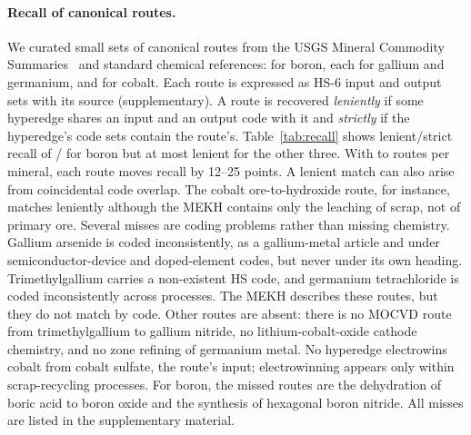 \paragraph{Recall of canonical routes.}
We curated small sets of canonical routes from the USGS Mineral Commodity Summaries~\cite{usgsmcs2025} and standard chemical references: \RoutesNBoron{} for boron, \RoutesNGallium{} each for gallium and germanium, and \RoutesNCobalt{} for cobalt. Each route is expressed as HS-6 input and output sets with its source (supplementary). A route is recovered \emph{leniently} if some hyperedge shares an input and an output code with it and \emph{strictly} if the hyperedge's code sets contain the route's. Table~\ref{tab:recall} shows lenient/strict recall of \RecallLenientBoron{}/\RecallStrictBoron{} for boron but at most \RecallLenientGermanium{} lenient for the other three. With \RoutesNMin{} to \RoutesNMax{} routes per mineral, each route moves recall by 12--25 points. A lenient match can also arise from coincidental code overlap. The cobalt ore-to-hydroxide route, for instance, matches leniently although the MEKH contains only the leaching of scrap, not of primary ore. Several misses are coding problems rather than missing chemistry. Gallium arsenide is coded inconsistently, as a gallium-metal article and under semiconductor-device and doped-element codes, but never under its own heading. Trimethylgallium carries a non-existent HS code, and germanium tetrachloride is coded inconsistently across processes. The MEKH describes these routes, but they do not match by code. Other routes are absent: there is no MOCVD route from trimethylgallium to gallium nitride, no lithium-cobalt-oxide cathode chemistry, and no zone refining of germanium metal. No hyperedge electrowins cobalt from cobalt sulfate, the route's input; electrowinning appears only within scrap-recycling processes. For boron, the missed routes are the dehydration of boric acid to boron oxide and the synthesis of hexagonal boron nitride. All misses are listed in the supplementary material.

